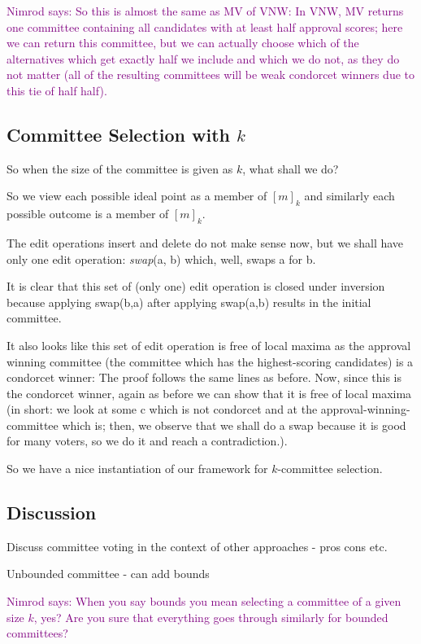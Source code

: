 \documentclass[sigconf]{aamas}  %
\newcommand{\nimrod}[1]{\textcolor{purple}{Nimrod says: #1}}
\begin{document}
\nimrod{So this is almost the same as MV of VNW:
  In VNW, MV returns one committee containing all candidates with at least half approval scores; here we can return this committee, but we can actually choose which of the alternatives which get exactly half we include and which we do not, as they do not matter (all of the resulting committees will be weak condorcet winners due to this tie of half half).}


\subsection{Committee Selection with $k$}

So when the size of the committee is given as $k$, what shall we do?

So we view each possible ideal point as a member of $[m]_k$ and similarly each possible outcome is a member of $[m]_k$.

The edit operations insert and delete do not make sense now, but we shall have only one edit operation: \emph{swap}(a, b) which, well, swaps a for b.

It is clear that this set of (only one) edit operation is closed under inversion because applying swap(b,a) after applying swap(a,b) results in the initial committee.

It also looks like this set of edit operation is free of local maxima as the approval winning committee (the committee which has the highest-scoring candidates) is a condorcet winner:
  The proof follows the same lines as before.
Now, since this is the condorcet winner, again as before we can show that it is free of local maxima (in short: we look at some c which is not condorcet and at the approval-winning-committee which is; then, we observe that we shall do a swap because it is good for many voters, so we do it and reach a contradiction.).

So we have a nice instantiation of our framework for $k$-committee selection.


\subsection{Discussion}

Discuss committee voting in the context of other approaches - pros cons etc.

Unbounded committee - can add bounds

\nimrod{When you say bounds you mean selecting a committee of a given size $k$, yes? Are you sure that everything goes through similarly for bounded committees?}
\end{document}
